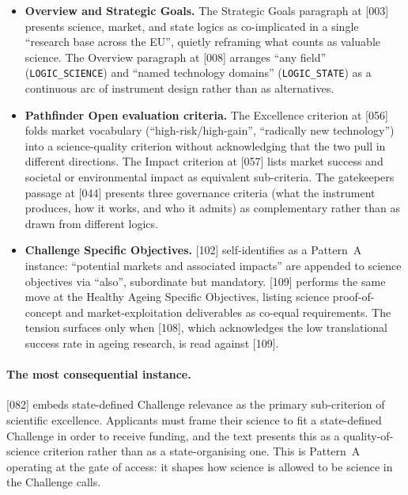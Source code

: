 \begin{itemize}[leftmargin=*]
  \item \textbf{Overview and Strategic Goals.} The Strategic Goals
    paragraph at [003] presents science, market, and state logics as
    co-implicated in a single \enquote{research base across the EU},
    quietly reframing what counts as valuable science. The Overview
    paragraph at [008] arranges \enquote{any field}
    (\texttt{LOGIC\_SCIENCE}) and \enquote{named technology domains}
    (\texttt{LOGIC\_STATE}) as a continuous arc of instrument design
    rather than as alternatives.
  \item \textbf{Pathfinder Open evaluation criteria.} The Excellence
    criterion at [056] folds market vocabulary
    (\enquote{high-risk/high-gain}, \enquote{radically new
    technology}) into a science-quality criterion without
    acknowledging that the two pull in different directions. The
    Impact criterion at [057] lists market success and societal or
    environmental impact as equivalent sub-criteria. The gatekeepers
    passage at [044] presents three governance criteria (what the
    instrument produces, how it works, and who it admits) as
    complementary rather than as drawn from different logics.
  \item \textbf{Challenge Specific Objectives.} [102] self-identifies
    as a Pattern~A instance: \enquote{potential markets and
    associated impacts} are appended to science objectives via
    \enquote{also}, subordinate but mandatory. [109] performs the
    same move at the Healthy Ageing Specific Objectives, listing
    science proof-of-concept and market-exploitation deliverables as
    co-equal requirements. The tension surfaces only when [108],
    which acknowledges the low translational success rate in ageing
    research, is read against [109].
\end{itemize}

\paragraph{The most consequential instance.}
[082] embeds state-defined Challenge relevance as the primary
sub-criterion of scientific excellence. Applicants must frame their
science to fit a state-defined Challenge in order to receive funding,
and the text presents this as a quality-of-science criterion rather
than as a state-organising one. This is Pattern~A operating at the
gate of access: it shapes how science is allowed to be science in the
Challenge calls.

